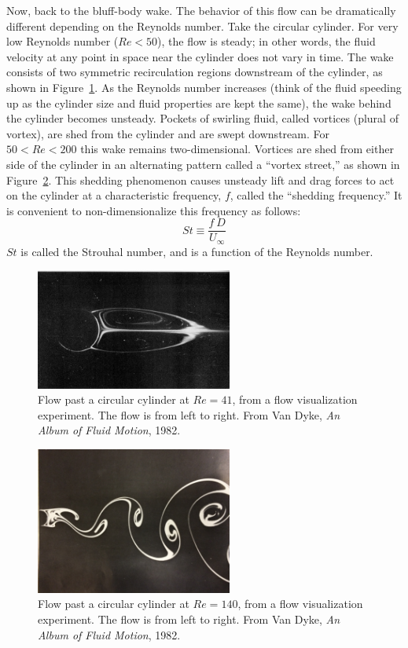 \documentclass{article}
\begin{document}
Now, back to the bluff-body wake.  The behavior of this flow can be
dramatically different depending on the Reynolds number.  Take the
circular cylinder.  For very low Reynolds number ($Re < 50$), the flow
is steady; in other words, the fluid velocity at any point in space
near the cylinder does not vary in time.  The wake consists of two
symmetric recirculation regions downstream of the cylinder, as shown
in Figure~\ref{cc_steady}.  As the Reynolds number increases (think of
the fluid speeding up as the cylinder size and fluid properties are
kept the same), the wake behind the cylinder becomes unsteady.
Pockets of swirling fluid, called vortices (plural of vortex), are shed
from the cylinder and are swept downstream.  For $50 < Re < 200$ this
wake remains two-dimensional.  Vortices are shed from either side of
the cylinder in an alternating pattern called a ``vortex street,'' as
shown in Figure~\ref{cc_unsteady}. This shedding phenomenon causes
unsteady lift and drag forces to act on the cylinder at a
characteristic frequency, $f$, called the ``shedding frequency.''  It
is convenient to non-dimensionalize this frequency as follows:
\begin{equation}
  St \equiv \frac{f~D}{U_\infty}
\end{equation}
$St$ is called the Strouhal number, and is a function of the Reynolds
number.
\begin{figure}[h]
\centering
\includegraphics[width=0.575\textwidth]{images/circ_cyl_steady.jpg}
\caption{Flow past a circular cylinder at $Re = 41$, from a flow
  visualization experiment.  The flow is from left to
  right. From Van Dyke, {\em An Album of Fluid Motion}, 1982. \label{cc_steady}}
\end{figure}

\begin{figure}[h!]
\centering
\includegraphics[width=0.575\textwidth]{images/circ_cyl_vandyke.jpg}
\caption{Flow past a circular cylinder at $Re = 140$, from a flow
  visualization experiment.  The flow is from left to
  right. From Van Dyke, {\em An Album of Fluid Motion}, 1982. \label{cc_unsteady}}
\end{figure}
\end{document}
